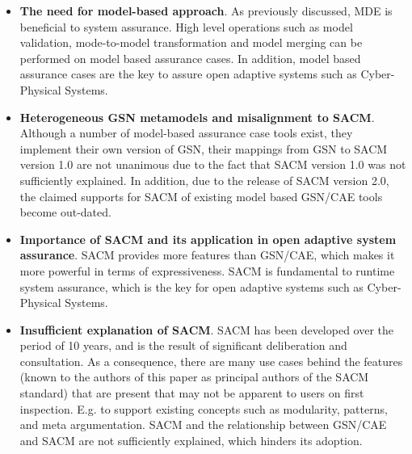 \begin{itemize}
	\item \textbf{The need for model-based approach}. 
	As previously discussed, MDE is beneficial to system assurance. 
	High level operations such as model validation, mode-to-model transformation and model merging can be performed on model based assurance cases. In addition, model based assurance cases are the key to assure open adaptive systems such as Cyber-Physical Systems.
	\item \textbf{Heterogeneous GSN metamodels and misalignment to SACM}.
	Although a number of model-based assurance case tools exist, they implement their own version of GSN, their mappings from GSN to SACM version 1.0 are not unanimous due to the fact that SACM version 1.0 was not sufficiently explained. 
	In addition, due to the release of SACM version 2.0, the claimed supports for SACM of existing model based GSN/CAE tools become out-dated.
	\item \textbf{Importance of SACM and its application in open adaptive system assurance}. SACM provides more features than GSN/CAE, which makes it more powerful in terms of expressiveness. 
	SACM is fundamental to runtime system assurance, which is the key for open adaptive systems such as Cyber-Physical Systems.
	\item \textbf{Insufficient explanation of SACM}. SACM has been developed over the period of 10 years, and is the result of significant deliberation and consultation. As a consequence, there are many use cases behind the features (known to the authors of this paper as principal authors of the SACM standard) that are present that may not be apparent to users on first inspection.
	E.g. to support existing concepts such as modularity, patterns, and meta argumentation. 
	SACM and the relationship between GSN/CAE and SACM are not sufficiently explained, which hinders its adoption. 
\end{itemize}
